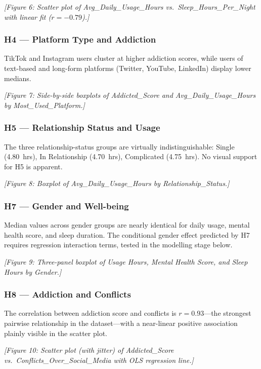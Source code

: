 \documentclass[10pt]{article}
\begin{document}
\textit{[Figure 6: Scatter plot of Avg\_Daily\_Usage\_Hours vs.\
Sleep\_Hours\_Per\_Night with linear fit ($r = -0.79$).]}

\subsubsection{H4 --- Platform Type and Addiction}

TikTok and Instagram users cluster at higher addiction scores, while users of
text-based and long-form platforms (Twitter, YouTube, LinkedIn) display lower
medians.

\textit{[Figure 7: Side-by-side boxplots of Addicted\_Score and
Avg\_Daily\_Usage\_Hours by Most\_Used\_Platform.]}

\subsubsection{H5 --- Relationship Status and Usage}

The three relationship-status groups are virtually indistinguishable: Single
(4.80~hrs), In Relationship (4.70~hrs), Complicated (4.75~hrs). No visual
support for H5 is apparent.

\textit{[Figure 8: Boxplot of Avg\_Daily\_Usage\_Hours by
Relationship\_Status.]}

\subsubsection{H7 --- Gender and Well-being}

Median values across gender groups are nearly identical for daily usage, mental
health score, and sleep duration. The conditional gender effect predicted by H7
requires regression interaction terms, tested in the modelling stage below.

\textit{[Figure 9: Three-panel boxplot of Usage Hours, Mental Health Score, and
Sleep Hours by Gender.]}

\subsubsection{H8 --- Addiction and Conflicts}

The correlation between addiction score and conflicts is $r = 0.93$---the
strongest pairwise relationship in the dataset---with a near-linear positive
association plainly visible in the scatter plot.

\textit{[Figure 10: Scatter plot (with jitter) of Addicted\_Score vs.\
Conflicts\_Over\_Social\_Media with OLS regression line.]}
\end{document}
